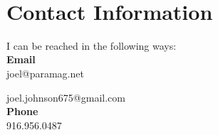\documentclass[titlepage]{article}
\begin{document}
    \noindent\makebox[\linewidth]{\rule{\textwidth}{0.4pt}}
    \\

\section{Contact Information}

    I can be reached in the following ways:
    \\
    
    \noindent\textbf{Email} 
    \\
    
        joel@paramag.net
    
        joel.johnson675@gmail.com
    \\
    
    \noindent\textbf{Phone}  
    \\
    
        916.956.0487
\end{document}

